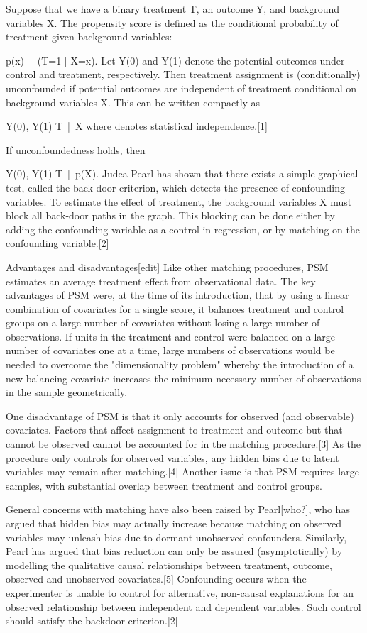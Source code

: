Suppose that we have a binary treatment T, an outcome Y, and background variables X. The propensity score is defined as the conditional probability of treatment given background variables:

p(x) \ \  \Pr(T=1 | X=x).
Let Y(0) and Y(1) denote the potential outcomes under control and treatment, respectively. Then treatment assignment is (conditionally) unconfounded if potential outcomes are independent of treatment conditional on background variables X. This can be written compactly as

 Y(0), Y(1) \perp T \,|\, X 
where \perp denotes statistical independence.[1]

If unconfoundedness holds, then

 Y(0), Y(1) \perp T \,|\, p(X).
Judea Pearl has shown that there exists a simple graphical test, called the back-door criterion, which detects the presence of confounding variables. To estimate the effect of treatment, the background variables X must block all back-door paths in the graph. This blocking can be done either by adding the confounding variable as a control in regression, or by matching on the confounding variable.[2]

Advantages and disadvantages[edit]
Like other matching procedures, PSM estimates an average treatment effect from observational data. The key advantages of PSM were, at the time of its introduction, that by using a linear combination of covariates for a single score, it balances treatment and control groups on a large number of covariates without losing a large number of observations. If units in the treatment and control were balanced on a large number of covariates one at a time, large numbers of observations would be needed to overcome the "dimensionality problem" whereby the introduction of a new balancing covariate increases the minimum necessary number of observations in the sample geometrically.

One disadvantage of PSM is that it only accounts for observed (and observable) covariates. Factors that affect assignment to treatment and outcome but that cannot be observed cannot be accounted for in the matching procedure.[3] As the procedure only controls for observed variables, any hidden bias due to latent variables may remain after matching.[4] Another issue is that PSM requires large samples, with substantial overlap between treatment and control groups.

General concerns with matching have also been raised by Pearl[who?], who has argued that hidden bias may actually increase because matching on observed variables may unleash bias due to dormant unobserved confounders. Similarly, Pearl has argued that bias reduction can only be assured (asymptotically) by modelling the qualitative causal relationships between treatment, outcome, observed and unobserved covariates.[5] Confounding occurs when the experimenter is unable to control for alternative, non-causal explanations for an observed relationship between independent and dependent variables. Such control should satisfy the backdoor criterion.[2]

